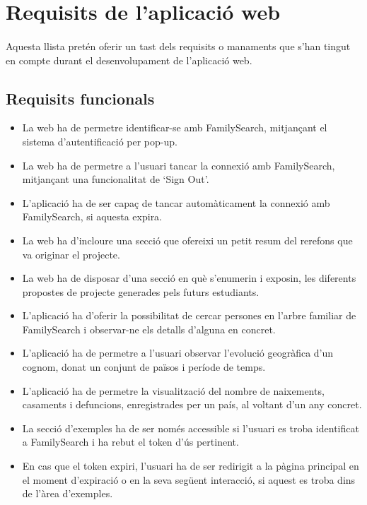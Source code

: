 \section{Requisits de l'aplicació web}\label{sec:requisits}

    \paragraph{}
    Aquesta llista pretén oferir un tast dels requisits o manaments que s'han tingut en compte durant el desenvolupament de l'aplicació web.

    \subsection{Requisits funcionals}

    \begin{itemize}
        \item La web ha de permetre identificar-se amb FamilySearch, mitjançant el sistema d'autentificació per pop-up.
        \item La web ha de permetre a l'usuari tancar la connexió amb FamilySearch, mitjançant una funcionalitat de `Sign Out'.
        \item L'aplicació ha de ser capaç de tancar automàticament la connexió amb Family\-Search, si aquesta expira.
        \item La web ha d'incloure una secció que ofereixi un petit resum del rerefons que va originar el projecte.
        \item La web ha de disposar d'una secció en què s'enumerin i exposin, les diferents propostes de projecte generades pels futurs estudiants.
        \item L'aplicació ha d'oferir la possibilitat de cercar persones en l'arbre familiar de FamilySearch i observar-ne els detalls d'alguna en concret.
        \item L'aplicació ha de permetre a l'usuari observar l'evolució geogràfica d'un cognom, donat un conjunt de països i període de temps.
        \item L'aplicació ha de permetre la visualització del nombre de naixements, casaments i defuncions, enregistrades per un país, al voltant d'un any concret.
        \item La secció d'exemples ha de ser només accessible si l'usuari es troba identificat a FamilySearch i ha rebut el token d'ús pertinent.
        \item En cas que el token expiri, l'usuari ha de ser redirigit a la pàgina principal en el moment d'expiració o en la seva següent interacció, si aquest es troba dins de l'àrea d'exemples.

\end{itemize}
